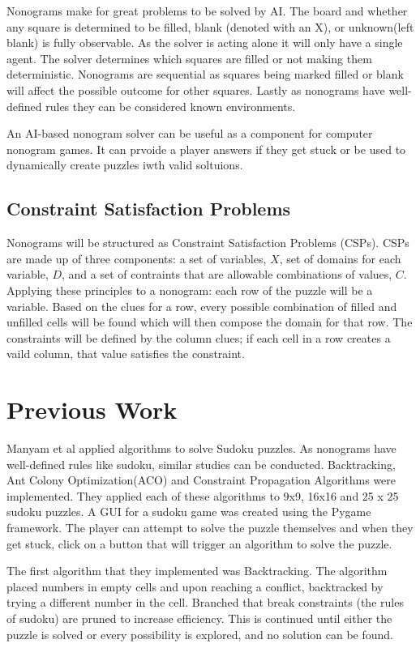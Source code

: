 \documentclass[12pt, letterpaper]
{article}
\begin{document}
    Nonograms make for great problems to be solved by AI. The board and whether any square is determined to be filled, blank (denoted with an X), or unknown(left blank) is fully observable. As the solver is acting alone it will only have a single agent. The solver determines which squares are filled or not making them deterministic. Nonograms are sequential as squares being marked filled or blank will affect the possible outcome for other squares. Lastly as nonograms have well-defined rules they can be considered known environments. 
    
    An AI-based nonogram solver can be useful as a component for computer nonogram games. It can prvoide a player answers if they get stuck or be used to dynamically create puzzles iwth valid soltuions.

    \subsection{Constraint Satisfaction Problems}
    Nonograms will be structured as Constraint Satisfaction Problems (CSPs). CSPs are made up of three components: a set of variables, $X$, set of domains for each variable, $D$, and a set of contraints that are allowable combinations of values, $C$. Applying these principles to a nonogram: each row of the puzzle will be a variable. Based on the clues for a row, every possible combination of filled and unfilled cells will be found which will then compose the domain for that row. The constraints will be defined by the column clues; if each cell in a row creates a vaild column, that value satisfies the constraint.






\section{Previous Work}
    Manyam et al \cite{10863160} applied algorithms to solve Sudoku puzzles. As nonograms have well-defined rules like sudoku, similar studies can be conducted. Backtracking, Ant Colony Optimization(ACO) and Constraint Propagation Algorithms were implemented. They applied each of these algorithms to 9x9, 16x16 and 25 x 25 sudoku puzzles. A GUI for a sudoku game was created using the Pygame framework. The player can attempt to solve the puzzle themselves and when they get stuck, click on a button that will trigger an algorithm to solve the puzzle.

    The first algorithm that they implemented was Backtracking. The algorithm placed numbers in empty cells and upon reaching a conflict, backtracked by trying a different number in the cell. Branched that break constraints (the rules of sudoku) are pruned to increase efficiency. This is continued until either the puzzle is solved or every possibility is explored, and no solution can be found.
\end{document}
